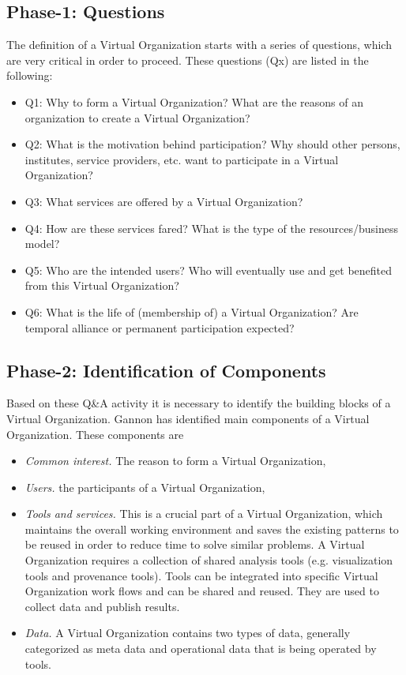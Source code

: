 \documentclass[]{article}
\begin{document}
\subsection{Phase-1: Questions}
The definition of a Virtual Organization starts with a series of questions, which are very critical in order to proceed. These questions (Qx) are listed in the following:

\begin{itemize}
\item Q1: Why to form a Virtual Organization? What are the reasons of an organization to create a Virtual Organization?
\item Q2: What is the motivation behind participation? Why should other persons, institutes, service providers, etc. want to participate in a Virtual Organization?
\item Q3: What services are offered by a Virtual Organization?
\item Q4: How are these services fared? What is the type of the resources/business model?
\item Q5: Who are the intended users? Who will eventually use and get benefited from this Virtual Organization?
\item Q6: What is the life of (membership of) a Virtual Organization? Are temporal alliance or permanent participation expected?
\end{itemize}

\subsection{Phase-2: Identification of Components}
Based on these Q\&A activity it is necessary to identify the building blocks of a Virtual Organization. Gannon \cite{Gannon2008} has identified main components of a Virtual Organization. These components are

\begin{itemize}
\item \emph{Common interest.} The reason to form a Virtual Organization,
\item \emph{Users.} the participants of a Virtual Organization,
\item \emph{Tools and services.} This is a crucial part of a Virtual Organization, which maintains the overall working environment and saves the existing patterns to be reused in order to reduce time to solve similar problems. A Virtual Organization requires a collection of shared analysis tools (e.g. visualization tools and provenance tools). Tools can be integrated into specific Virtual Organization work flows and can be shared and reused. They are used to collect data and publish results.
\item \emph{Data.} A Virtual Organization contains two types of data, generally categorized as meta data and operational data that is being operated by tools.
\end{itemize}
\end{document}
